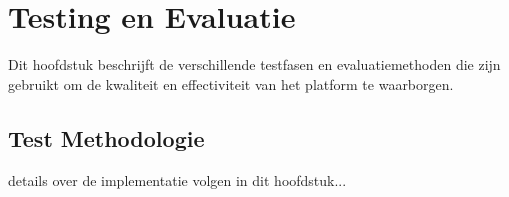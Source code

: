 \chapter{Testing en Evaluatie}
\label{ch:testing}

Dit hoofdstuk beschrijft de verschillende testfasen en evaluatiemethoden die zijn gebruikt om de kwaliteit en effectiviteit van het platform te waarborgen.

\section{Test Methodologie}
\label{sec:test-methodologie}

details over de implementatie volgen in dit hoofdstuk...